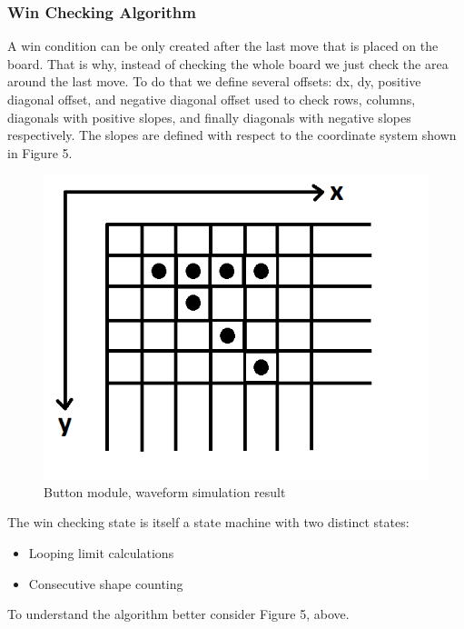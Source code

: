 \documentclass[conference]{IEEEtran}
\begin{document}
\subsubsection{Win Checking Algorithm} 
A win condition can be only created after the last move that is placed on the board. That is why, instead of checking the whole board we just check the area around the last move. To do that we define several offsets: dx, dy, positive diagonal offset, and negative diagonal offset used to check rows, columns, diagonals with positive slopes, and finally diagonals with negative slopes respectively. The slopes are defined with respect to the coordinate system shown in Figure 5.
 \begin{figure}[H]
   \centerline{\includegraphics[scale=0.6]{check.png}}
    \caption{Button module, waveform simulation result}
\end{figure} 
The win checking state is itself a state machine with two distinct states: 
\begin{itemize}
\item Looping limit calculations
\item Consecutive shape counting
\end{itemize}
To understand the algorithm better consider Figure 5, above. \\
\end{document}
